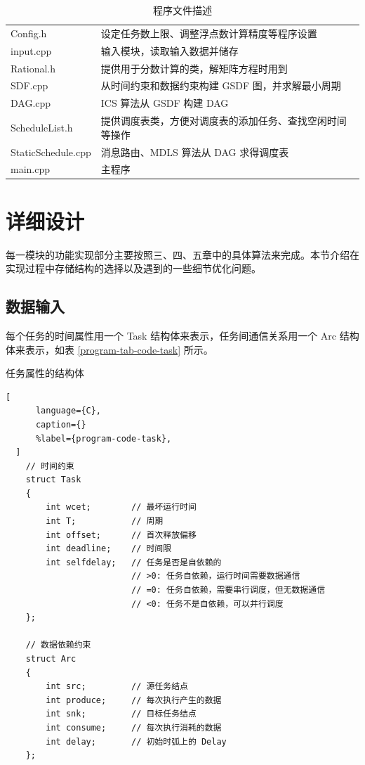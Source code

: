 {\renewcommand{\arraystretch}{1.5}
\begin{table}
  \centering
  \caption{程序文件描述}
  \label{program-tab-file}
  \begin{tabular}{|l|l|}
    \hline
    Config.h & 设定任务数上限、调整浮点数计算精度等程序设置 \\
    input.cpp & 输入模块，读取输入数据并储存 \\
    Rational.h & 提供用于分数计算的类，解矩阵方程时用到 \\
    SDF.cpp & 从时间约束和数据约束构建 GSDF 图，并求解最小周期 \\
    DAG.cpp & ICS 算法从 GSDF 构建 DAG \\
    ScheduleList.h & 提供调度表类，方便对调度表的添加任务、查找空闲时间等操作 \\
    StaticSchedule.cpp & 消息路由、MDLS 算法从 DAG 求得调度表 \\
    main.cpp & 主程序\\
    \hline
  \end{tabular}
\end{table}
}

\section{详细设计}
每一模块的功能实现部分主要按照三、四、五章中的具体算法来完成。本节介绍在实现过程中存储结构的选择以及遇到的一些细节优化问题。

\subsection{数据输入}
\label{sec-data-structure}

每个任务的时间属性用一个 Task 结构体来表示，任务间通信关系用一个 Arc 结构体来表示，如表 \ref{program-tab-code-task} 所示。

{\renewcommand{\arraystretch}{1.5}
\begin{table}
  \caption{任务属性的结构体}
  \label{program-tab-code-task}
  \begin{lstlisting}[
      language={C},
      caption={}
      %label={program-code-task},
  ]
    // 时间约束
    struct Task
    {
        int wcet;        // 最坏运行时间
        int T;           // 周期
        int offset;      // 首次释放偏移
        int deadline;    // 时间限
        int selfdelay;   // 任务是否是自依赖的
                         // >0: 任务自依赖，运行时间需要数据通信
                         // =0: 任务自依赖，需要串行调度，但无数据通信
                         // <0: 任务不是自依赖，可以并行调度
    };

    // 数据依赖约束
    struct Arc
    {
        int src;         // 源任务结点
        int produce;     // 每次执行产生的数据
        int snk;         // 目标任务结点
        int consume;     // 每次执行消耗的数据
        int delay;       // 初始时弧上的 Delay
    };
  \end{lstlisting}
\end{table}
}

